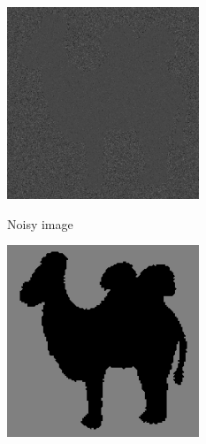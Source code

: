 \documentclass{article}
\begin{document}
\begin{figure}[htb]
    \begin{minipage}[b]{0.30\linewidth}
      \centering
      \centerline{\includegraphics[width=\textwidth, cfbox=black 1pt 0pt]{ress/camel40/camel40.png}}
      \centerline{Noisy image}\medskip
    \end{minipage}
    \hfill
    \begin{minipage}[b]{.30\linewidth}
      \centering
      \centerline{\includegraphics[width=\textwidth, cfbox=black 1pt 0pt]{ress/camel40/camel40_label.png}}

\end{minipage}
\end{figure}
\end{document}
